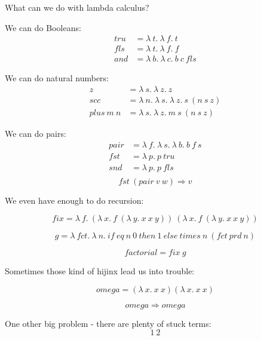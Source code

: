 \begin{frame}
  What can we do with lambda calculus?
\end{frame}

\begin{frame}
  We can do Booleans:
  \begin{align*}
   tru &= \lambda~t.~\lambda~f.~t \\
   fls &= \lambda~t.~\lambda~f.~f \\
   and &= \lambda~b.~\lambda~c.~b~c~fls
  \end{align*}
\end{frame}

\begin{frame}
  We can do natural numbers:
  \begin{align*}
  z &= \lambda~s.~\lambda~z.~z \\
  scc &= \lambda~n.~\lambda~s.~\lambda~z.~s~\left(n~s~z\right) \\
  plus~m~n &= \lambda~s.~\lambda~z.~m~s~\left(n~s~z\right)
  \end{align*}
\end{frame}

\begin{frame}
  We can do pairs:
  \begin{align*}
    pair &= \lambda~f.~\lambda~s.~\lambda~b.~b~f~s \\
    fst &= \lambda~p.~p~tru \\
    snd &= \lambda~p.~p~fls \\
  \end{align*}
  \[fst~\left(pair~v~w\right) \Rightarrow v\]
\end{frame}

\begin{frame}
  We even have enough to do recursion:
  
  \[fix = \lambda~f.~\left(\lambda~x.~f~\left(\lambda~y.~x~x~y\right)\right)~\left(\lambda~x.~f~\left(\lambda~y.~x~x~y\right)\right)\]

  \[g = \lambda~fct.~\lambda~n.~if~eq~n~0~then~1~else~times~n~\left(fct~prd~n\right)\]

  \[factorial = fix~g\]
\end{frame}

\begin{frame}
  Sometimes those kind of hijinx lead us into trouble:
  
  \[omega = \left(\lambda~x.~x~x\right) \left(\lambda~x.~x~x\right)\]

  \[omega \Rightarrow omega\]
\end{frame}

\begin{frame}
  One other big problem - there are plenty of stuck terms:
  \[1~2\]
\end{frame}

